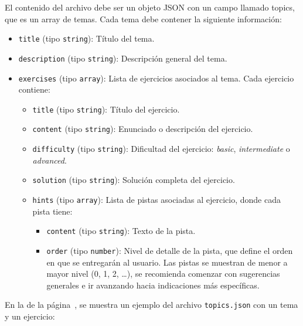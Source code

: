 El contenido del archivo debe ser un objeto JSON con un campo llamado topics, que es un array de temas. Cada tema debe contener la siguiente información:
\begin{itemize}
    \item \texttt{title} (tipo \texttt{string}): Título del tema.
    \item \texttt{description} (tipo \texttt{string}): Descripción general del tema.
    \item \texttt{exercises} (tipo \texttt{array}): Lista de ejercicios asociados al tema. Cada ejercicio contiene:
    \begin{itemize}
        \item \texttt{title} (tipo \texttt{string}): Título del ejercicio.
        \item \texttt{content} (tipo \texttt{string}): Enunciado o descripción del ejercicio.
        \item \texttt{difficulty} (tipo \texttt{string}): Dificultad del ejercicio: \textit{basic}, \textit{intermediate} o \textit{advanced}.
        \item \texttt{solution} (tipo \texttt{string}): Solución completa del ejercicio.
        \item \texttt{hints} (tipo \texttt{array}): Lista de pistas asociadas al ejercicio, donde cada pista tiene:
        \begin{itemize}
            \item \texttt{content} (tipo \texttt{string}): Texto de la pista.
            \item \texttt{order} (tipo \texttt{number}): Nivel de detalle de la pista, que define el orden en que se entregarán al usuario. Las pistas se muestran de menor a mayor nivel (0, 1, 2, \ldots), se recomienda comenzar con sugerencias generales e ir avanzando hacia indicaciones más específicas.
        \end{itemize}
    \end{itemize}
\end{itemize}

En la  de la página~\pageref{fig:json}, se muestra un ejemplo del archivo \texttt{topics.json} con un tema y un ejercicio:

